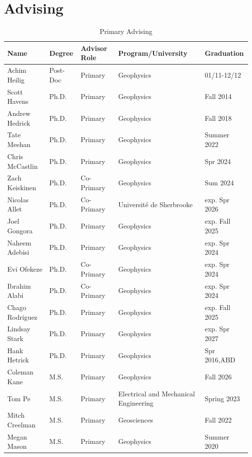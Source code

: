 \documentclass[11pt]{article}
\renewcommand\arraystretch{1}
\begin{document}
\pagebreak

\section*{Advising}
\begin{table}[!htbp]
\caption*{Primary Advising}
\small
\renewcommand\arraystretch{0.7}
  \centering
  \begin{tabular}{|l|l|l|l|l|}
\hline
\textbf{Name} & \textbf{Degree} & \textbf{Advisor Role} & \textbf{Program/University} & \textbf{Graduation} \\ \hline \hline
Achim Heilig & Post-Doc & Primary & Geophysics & 01/11-12/12 \\ \hline
Scott Havens & Ph.D. & Primary & Geophysics & Fall 2014 \\ \hline
Andrew Hedrick & Ph.D. & Primary & Geophysics & Fall 2018 \\ \hline
Tate Meehan & Ph.D. & Primary & Geophysics & Summer 2022 \\ \hline
Chris McCastlin & Ph.D. & Primary & Geophysics & Spr 2024 \\ \hline
Zach Keiskinen & Ph.D. & Co-Primary & Geophysics & Sum 2024  \\ \hline
Nicolas Allet & Ph.D. & Co-Primary & Université de Sherbrooke & exp. Spr 2026 \\ \hline
Joel Gongora & Ph.D. & Primary & Geophysics & exp. Fall 2025 \\ \hline
Naheem Adebisi & Ph.D. & Primary & Geophysics & exp. Spr 2024  \\ \hline
Evi Ofekeze & Ph.D. & Co-Primary & Geophysics & exp. Spr 2024  \\ \hline
Ibrahim Alabi & Ph.D. & Co-Primary & Geophysics & exp. Spr 2024  \\ \hline
Chago Rodriguez & Ph.D. & Primary & Geophysics & exp. Fall 2025 \\ \hline
Lindsay Stark & Ph.D. & Primary & Geophysics & exp. Spr 2027 \\ \hline
Hank Hetrick & Ph.D. & Primary & Geophysics & Spr 2016,ABD \\ \hline
Coleman Kane & M.S. & Primary & Geophysics & Fall 2026 \\ \hline
Tom Pe & M.S. & Primary & Electrical and Mechanical Engineering & Spring 2023 \\ \hline
Mitch Creelman & M.S. & Primary & Geosciences & Fall 2022 \\ \hline
Megan Mason & M.S. & Primary & Geophysics & Summer 2020 \\ \hline

\end{tabular}
\end{table}
\end{document}
